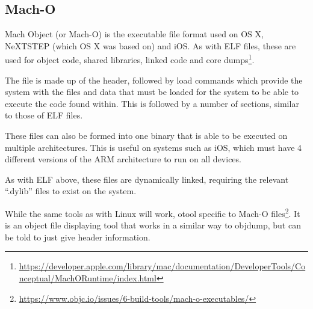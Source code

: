 		\subsection{Mach-O}
			Mach Object (or Mach-O) is the executable file format used on OS X, NeXTSTEP (which OS X was based on) and iOS. 
			As with ELF files, these are used for object code, shared libraries, linked code and core dumps\footnote{\url{https://developer.apple.com/library/mac/documentation/DeveloperTools/Conceptual/MachORuntime/index.html}}.

			The file is made up of the header, followed by load commands which provide the system with the files and data that must be loaded for the system to be able to execute the code found within. 
			This is followed by a number of sections, similar to those of ELF files. 

			These files can also be formed into one binary that is able to be executed on multiple architectures. 
			This is useful on systems such as iOS, which must have 4 different versions of the ARM architecture to run on all devices. 

			As with ELF above, these files are dynamically linked, requiring the relevant ``.dylib'' files to exist on the system. 
			
			While the same tools as with Linux will work, otool specific to Mach-O files\footnote{\url{https://www.objc.io/issues/6-build-tools/mach-o-executables/}}.
			It is an object file displaying tool that works in a similar way to objdump, but can be told to just give header information. 

